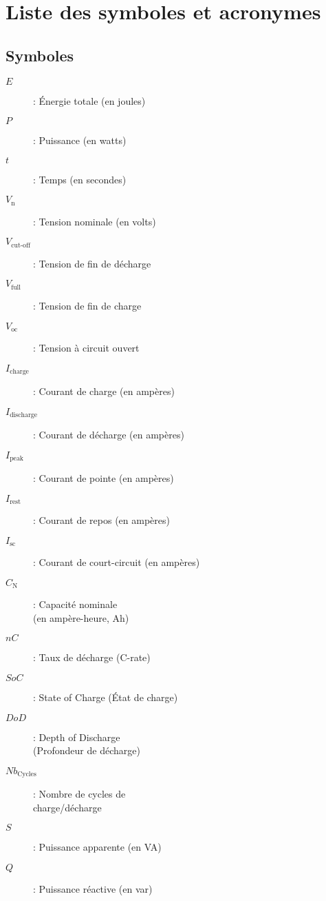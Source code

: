 \chapter*{Liste des symboles et acronymes}
{}

\section*{Symboles}

\begin{multicols}{2}
	\setlength\columnsep{1cm} %
	\setlength\columnseprule{0.4pt}
	\begin{description}
		\item[$E$] : Énergie totale (en joules)
		\item[$P$] : Puissance (en watts)
		\item[$t$] : Temps (en secondes)
		\item[$V_\text{n}$] : Tension nominale (en volts)
		\item[$V_\text{cut-off}$] : Tension de fin de décharge
		\item[$V_\text{full}$] : Tension de fin de charge
		\item[$V_\text{oc}$] : Tension à circuit ouvert
		\item[$I_\text{charge}$] : Courant de charge (en ampères)
		\item[$I_\text{discharge}$] : Courant de décharge (en ampères)
		\item[$I_\text{peak}$] : Courant de pointe (en ampères)
		\item[$I_\text{rest}$] : Courant de repos (en ampères)
		\item[$I_\text{sc}$] : Courant de court-circuit (en ampères)
		\item[$C_\text{N}$] : Capacité nominale \\(en ampère-heure, Ah)
		\item[$nC$] : Taux de décharge (C-rate)
		\item[$SoC$] : State of Charge (État de charge)
		\item[$DoD$] : Depth of Discharge \\(Profondeur de décharge)
		\item[$Nb_\text{Cycles}$] : Nombre de cycles de \\charge/décharge
		\item[$S$] : Puissance apparente (en VA)
		\item[$Q$] : Puissance réactive (en var)

\end{description}
\end{multicols}
